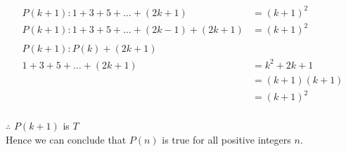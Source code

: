 \documentclass[12pt letter]{report}
\begin{document}
{  \begin{align*}
    P \left( k + 1 \right): 1 + 3 + 5 + \ldots + \left( 2k +1 \right)                          & = \left( k + 1 \right) ^2                  \\
    P \left( k + 1 \right): 1 + 3 + 5 + \ldots + \left( 2k - 1 \right) + \left( 2k + 1 \right) & = \left( k + 1
    \right)^2                                                                                                                               \\
    \\
    P \left( k + 1 \right): P \left( k \right) + \left( 2k + 1 \right)                                                                      \\
    1 + 3 + 5 + \ldots + \left( 2k + 1 \right)                                                 & = k^2 + 2k + 1                             \\
                                                                                               & = \left( k + 1 \right)\left( k + 1 \right) \\
                                                                                               & = \left( k + 1 \right)^2                   \\
  \end{align*}

  \noindent$\therefore$ $P \left( k + 1 \right) $ is $T$ \\
  Hence we can conclude that $P \left( n \right) $ is true for all positive integers $n$.
}


\end{document}
